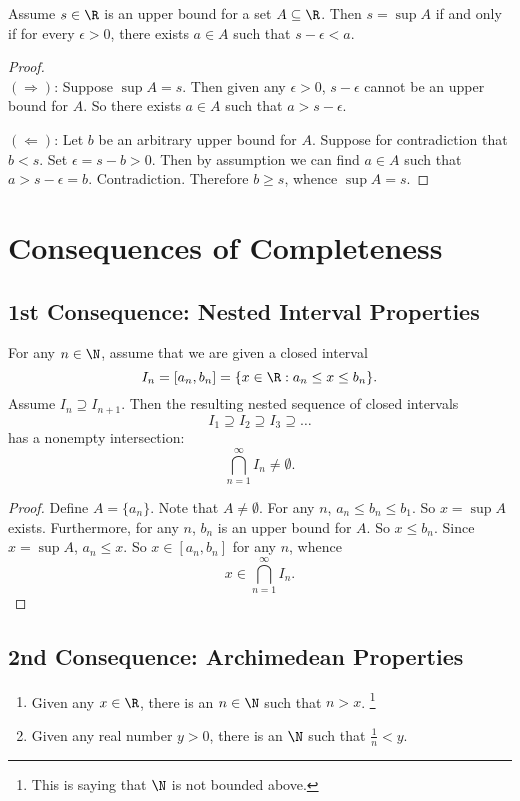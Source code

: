 \begin{lemma}
  Assume $s \in \R$ is an upper bound for a set
  $A \subseteq \R$. Then $s = \sup A$ if and only
  if for every $\epsilon > 0$, there exists
  $a \in A$ such that  $s - \epsilon < a$.
\end{lemma}

\begin{proof}\leavevmode\\
$(\Longrightarrow)$: Suppose $\sup A = s$. Then given any
$\epsilon > 0$,  $s - \epsilon$ cannot be an upper
bound for $A$. So there exists $a \in A$ such that
$a > s - \epsilon$.

$(\Longleftarrow)$: Let $b$ be an arbitrary upper bound
for $A$. Suppose for contradiction that $b < s$. Set
$\epsilon = s - b > 0$. Then by assumption we can
find $a \in A$ such that $a > s - \epsilon = b$.
Contradiction. Therefore $b \ge s$, whence $\sup A = s$.
\end{proof}

\section{Consequences of Completeness}
\subsection{1st Consequence: Nested Interval Properties}
\begin{theorem}
  For any $n \in \N$, assume that we are given a closed
  interval
  \[
    I_n = [a_n, b_n] = \{x \in \R : a_n \le x \le b_n\}
  .\]
  Assume $I_n \supseteq I_{n+1}$. Then the resulting
  nested sequence of closed intervals
  \[I_1 \supseteq I_2 \supseteq I_3 \supseteq \dots\]
  has a nonempty intersection:
  \[\bigcap_{n=1}^\infty I_n \ne \emptyset.\]
\end{theorem}

\begin{proof}
  Define $A = \{a_n\}$. Note that  $A \ne \emptyset$.
  For any $n$, $a_n \le b_n \le b_1$. So $x = \sup A$
  exists. Furthermore, for any $n$, $b_n$ is an upper
  bound for $A$. So  $x \le b_n$. Since  $x = \sup A$,
  $a_n \le x$. So $x \in [a_n, b_n]$ for any $n$,
  whence
  \[x \in \bigcap_{n = 1}^\infty I_n.\]
\end{proof}

\subsection{2nd Consequence: Archimedean Properties}
\begin{theorem}\leavevmode
  \begin{enumerate}
    \item Given any $x \in \R$, there is an $n \in \N$
      such that $n > x$.
    \footnote{This is saying that $\N$ is not bounded
      above.}
    \item Given any real number $y > 0$, there is an
      $\N$ such that  $\frac{1}{n} < y$.
  \end{enumerate}
\end{theorem}

